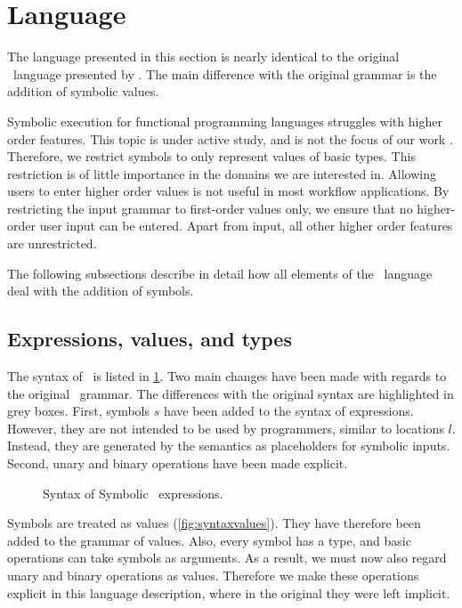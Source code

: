 

\section{Language}
\label{sec:language}

The language presented in this section is nearly identical to the original \TOPHAT\ language presented by \citet{DBLP:conf/ppdp/SteenvoordenNK19}.
The main difference with the original grammar is the addition of symbolic values.

Symbolic execution for functional programming languages struggles with higher order features.
This topic is under active study, and is not the focus of our work \cite{HallahanXP2017, DBLP:conf/pldi/HallahanXBJP19}.
Therefore, we restrict symbols to only represent values of basic types.
This restriction is of little importance in the domains we are interested in.
Allowing users to enter higher order values is not useful in most workflow applications.
By restricting the input grammar to first-order values only, we ensure that no higher-order user input can be entered.
Apart from input, all other higher order features are unrestricted.

The following subsections describe in detail how all elements of the \TOPHAT\ language deal with the addition of symbols.



\subsection{Expressions, values, and types}
\label{sec:expressions}

The syntax of \STOPHAT\ is listed in \cref{fig:syntaxtophat}.
Two main changes have been made with regards to the original \TOPHAT\ grammar.
The differences with the original syntax are highlighted in grey boxes.
First, symbols $s$ have been added to the syntax of expressions.
However, they are not intended to be used by programmers, similar to locations $l$.
Instead, they are generated by the semantics as placeholders for symbolic inputs.
Second, unary and binary operations have been made explicit.

\begin{figure}[ht]
  \small
  \caption{Syntax of Symbolic \TOPHAT\ expressions.}
  \label{fig:syntaxtophat}
\end{figure}

Symbols are treated as values (\cref{fig:syntaxvalues}).
They have therefore been added to the grammar of values.
Also, every symbol has a type, and basic operations can take symbols as arguments.
As a result, we must now also regard unary and binary operations as values.
Therefore we make these operations explicit in this language description,
where in the original they were left implicit.

